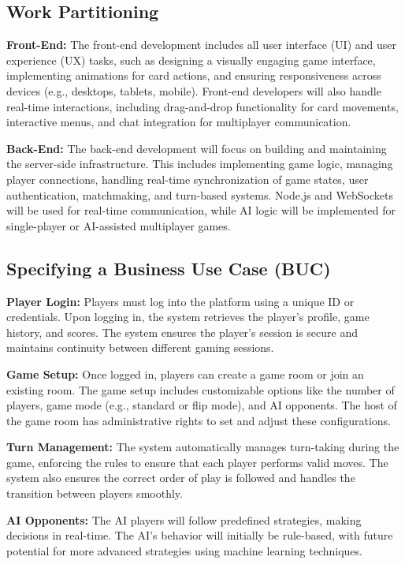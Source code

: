 \documentclass{article}
\begin{document}
\subsection{Work Partitioning}

\textbf{Front-End:} The front-end development includes all user interface (UI) and user experience (UX) tasks, such as designing a visually engaging game interface, implementing animations for card actions, and ensuring responsiveness across devices (e.g., desktops, tablets, mobile). Front-end developers will also handle real-time interactions, including drag-and-drop functionality for card movements, interactive menus, and chat integration for multiplayer communication.

\textbf{Back-End:} The back-end development will focus on building and maintaining the server-side infrastructure. This includes implementing game logic, managing player connections, handling real-time synchronization of game states, user authentication, matchmaking, and turn-based systems. Node.js and WebSockets will be used for real-time communication, while AI logic will be implemented for single-player or AI-assisted multiplayer games.

\subsection{Specifying a Business Use Case (BUC)}

\textbf{Player Login:} Players must log into the platform using a unique ID or credentials. Upon logging in, the system retrieves the player's profile, game history, and scores. The system ensures the player's session is secure and maintains continuity between different gaming sessions.

\textbf{Game Setup:} Once logged in, players can create a game room or join an existing room. The game setup includes customizable options like the number of players, game mode (e.g., standard or flip mode), and AI opponents. The host of the game room has administrative rights to set and adjust these configurations.

\textbf{Turn Management:} The system automatically manages turn-taking during the game, enforcing the rules to ensure that each player performs valid moves. The system also ensures the correct order of play is followed and handles the transition between players smoothly.

\textbf{AI Opponents:} The AI players will follow predefined strategies, making decisions in real-time. The AI’s behavior will initially be rule-based, with future potential for more advanced strategies using machine learning techniques.
\end{document}
